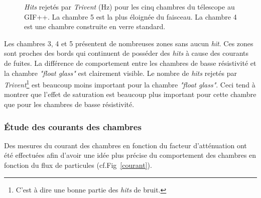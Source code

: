 \begin{figure}[ht!]
	\caption{\textit{Hits} rejetés par \textit{Trivent} (\si{\hertz}) pour les cinq chambres du télescope au GIF++. La chambre \num{5} est la plus éloignée du faisceau. La chambre \num{4} est une chambre construite en verre standard.}
	\label{struc}
\end{figure}

Les chambres \num{3}, \num{4} et \num{5} présentent de nombreuses zones sans aucun \textit{hit}. Ces zones sont proches des bords qui continuent de posséder des \textit{hits} à cause des courants de fuites. La différence de comportement entre les chambres de basse résistivité et la chambre \textit{"float glass"} est clairement visible. Le nombre de \textit{hits} rejetés par \textit{Trivent}\footnote{C'est à dire une bonne partie des \textit{hits} de bruit.} est beaucoup moins important pour la chambre \textit{"float glass"}. Ceci tend à montrer que l'effet de saturation est beaucoup plus important pour cette chambre que pour les chambres de basse résistivité.

\subsubsection{Étude des courants des chambres}
Des mesures du courant des chambres en fonction du facteur d'atténuation ont été effectuées afin d'avoir une idée plus précise du comportement des chambres en fonction du flux de particules (cf.Fig~\ref{courant}).

